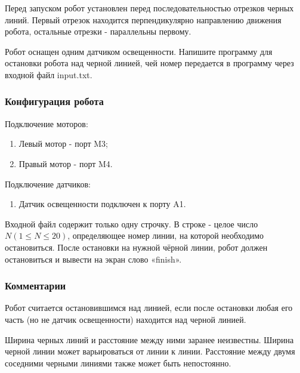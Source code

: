 
Перед запуском робот установлен перед последовательностью отрезков черных линий. Первый отрезок находится перпендикулярно направлению движения робота, остальные отрезки - параллельны первому.

Робот оснащен одним датчиком освещенности. Напишите программу для остановки робота над черной линией, чей номер передается в программу через входной файл input.txt.

\subsubsection*{Конфигурация робота}

Подключение моторов:

\begin{enumerate}
    \item Левый мотор - порт M3;
    \item Правый мотор - порт M4.
\end{enumerate}

Подключение датчиков:

\begin{enumerate}
    \item Датчик освещенности подключен к порту A1.
\end{enumerate}


 
Входной файл содержит только одну строчку. В строке - целое число $N (1 \leq N \leq 20)$, определяющее номер линии, на которой необходимо остановиться. После остановки на нужной чёрной линии, робот должен остановиться и вывести на экран слово «finish».

\subsubsection*{Комментарии}

Робот считается остановившимся над линией, если после остановки любая его часть (но не датчик освещенности) находится над черной линией.

Ширина черных линий и расстояние между ними заранее неизвестны. Ширина черной линии может варьироваться от линии к линии. Расстояние между двумя соседними черными линиями также может быть непостоянно.

